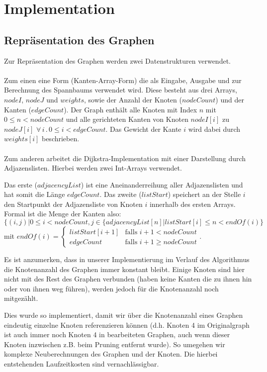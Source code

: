 \documentclass[a4paper,10pt]{article}
\begin{document}
\section{Implementation}
\subsection{Repräsentation des Graphen}
Zur Repräsentation des Graphen werden zwei Datenstrukturen verwendet.\\
\\
Zum einen eine Form (Kanten-Array-Form) die als Eingabe, Ausgabe und zur Berechnung des Spannbaums verwendet wird. Diese besteht aus drei Arrays, $nodeI$, $nodeJ$ und $weights$, sowie der Anzahl der Knoten ($nodeCount$) und der Kanten ($edgeCount$). Der Graph enthält alle Knoten mit Index $n$ mit $ 0 \le n < nodeCount$ und alle gerichteten Kanten von Knoten $nodeI[i]$ zu $nodeJ[i]$ $\forall \,i\,.\,0 \le i < edgeCount$. Das Gewicht der Kante $i$ wird dabei durch $weights[i]$ beschrieben.\\
\\
Zum anderen arbeitet die Dijkstra-Implementation mit einer Darstellung durch Adjazenslisten. Hierbei werden zwei Int-Arrays verwendet.

Das erste ($adjacencyList$) ist eine Aneinanderreihung aller Adjazenslisten und hat somit die Länge $edgeCount$. Das zweite ($listStart$) speichert an der Stelle $i$ den Startpunkt der Adjazensliste von Knoten $i$ innerhalb des ersten Arrays. Formal ist die Menge der Kanten also:\\
$\{ (i,j) | 0 \le i < nodeCount, 
j \in \{adjacencyList[n]|listStart[i] \le n < endOf(i)\}$\\ mit $endOf(i) = 
\left\{
	\begin{array}{ll}
		listStart[i+1]  & \mbox{falls } i+1 < nodeCount \\
		edgeCount & \mbox{falls } i+1 \ge nodeCount
	\end{array}
\right.$.
\bigskip

Es ist anzumerken, dass in unserer Implementierung im Verlauf des Algorithmus die Knotenanzahl des Graphen immer konstant bleibt. Einige Knoten sind hier nicht mit des Rest des Graphen verbunden (haben keine Kanten die zu ihnen hin oder von ihnen weg führen), werden jedoch für die Knotenanzahl noch mitgezählt.
\smallskip

Dies wurde so implementiert, damit wir über die Knotenanzahl eines Graphen eindeutig einzelne Knoten referenzieren können (d.h. Knoten 4 im Originalgraph ist auch immer noch Knoten 4 in bearbeiteten Graphen, auch wenn dieser Knoten inzwischen z.B. beim Pruning entfernt wurde). So umegehen wir komplexe Neuberechnungen des Graphen und der Knoten. Die hierbei entstehenden Laufzeitkosten sind vernachlässigbar.   
\end{document}
